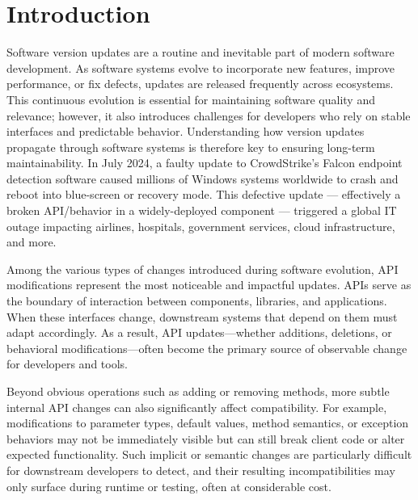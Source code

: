 \section{Introduction}



Software version updates are a routine and inevitable part of modern software development. As software systems evolve to incorporate new features, improve performance, or fix defects, updates are released frequently across ecosystems. This continuous evolution is essential for maintaining software quality and relevance; however, it also introduces challenges for developers who rely on stable interfaces and predictable behavior. Understanding how version updates propagate through software systems is therefore key to ensuring long-term maintainability. In July 2024, a faulty update to CrowdStrike’s Falcon endpoint detection software caused millions of Windows systems worldwide to crash and reboot into blue-screen or recovery mode. This defective update — effectively a broken API/behavior in a widely-deployed component — triggered a global IT outage impacting airlines, hospitals, government services, cloud infrastructure, and more.


Among the various types of changes introduced during software evolution, API modifications represent the most noticeable and impactful updates. APIs serve as the boundary of interaction between components, libraries, and applications. When these interfaces change, downstream systems that depend on them must adapt accordingly. As a result, API updates—whether additions, deletions, or behavioral modifications—often become the primary source of observable change for developers and tools.


Beyond obvious operations such as adding or removing methods, more subtle internal API changes can also significantly affect compatibility. For example, modifications to parameter types, default values, method semantics, or exception behaviors may not be immediately visible but can still break client code or alter expected functionality. Such implicit or semantic changes are particularly difficult for downstream developers to detect, and their resulting incompatibilities may only surface during runtime or testing, often at considerable cost.


